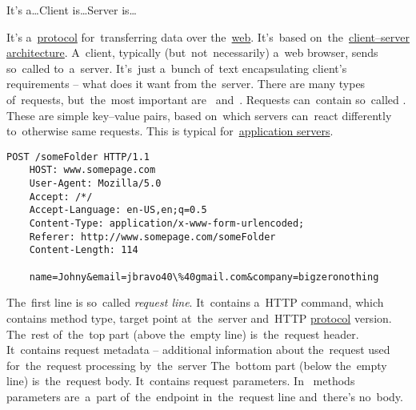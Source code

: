 \label{clientserverarchitecture}
\newline\todo It's a\dots Client is\dots Server is\dots

\label{tcpip}

\label{networkprotocols}

\label{tcp}

\label{ip}

\label{http}
It's a~\hyperref[protocolstandard]{protocol} for~transferring data over the~\hyperref[internetweb]{web}.
It's~based on~the~\hyperref[clientserverarchitecture]{client--server architecture}.
A~client, typically (but~not~necessarily) a~web browser, sends so~called  to~a~server.
It's~just a~bunch of~text encapsulating client's requirements -- what does it want from the~server.
There are many types of~requests, but~the~most important are~ and~.
Requests can~contain so~called .
These are simple key--value pairs, based on~which servers can~react differently to~otherwise same requests.
This is typical for~\hyperref[applicationserver]{application servers}.

\begin{lstlisting}[title={Example of a~HTTP \textit{POST} request, parameters are~visible at~the~bottom}]
    POST /someFolder HTTP/1.1
    HOST: www.somepage.com
    User-Agent: Mozilla/5.0
    Accept: /*/
    Accept-Language: en-US,en;q=0.5
    Content-Type: application/x-www-form-urlencoded;
    Referer: http://www.somepage.com/someFolder
    Content-Length: 114

    name=Johny&email=jbravo40\%40gmail.com&company=bigzeronothing
\end{lstlisting}

\noindent The~first line is so~called \textit{request line}.
It~contains a~HTTP command, which contains method type, target point at~the~server and~HTTP \hyperref[protocolstandard]{protocol} version.
The~rest of~the~top part (above the~empty line) is~the~request header.
It~contains request metadata -- additional information about the~request used for~the~request processing by~the~server
The~bottom part (below the~empty line) is~the~request body.
It~contains request parameters.
In~ methods parameters are~a~part of~the~endpoint in~the~request line and~there's no~body.

